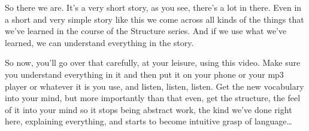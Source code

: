 So there we are. It's a very short story, as you see, there's a lot in there. Even in a short and very simple story like this we come across all kinds of the things that we've learned in the course of the Structure series. And if we use what we've learned, we can understand everything in the story.

So now, you'll go over that carefully, at your leisure, using this video. Make sure you understand everything in it and then put it on your phone or your mp3 player or whatever it is you use, and listen, listen, listen. Get the new vocabulary into your mind, but more importantly than that even, get the structure, the feel of it into your mind so it stops being abstract work, the kind we've done right here, explaining everything, and starts to become intuitive grasp of language\ldots{}

\stopsectionlevel
